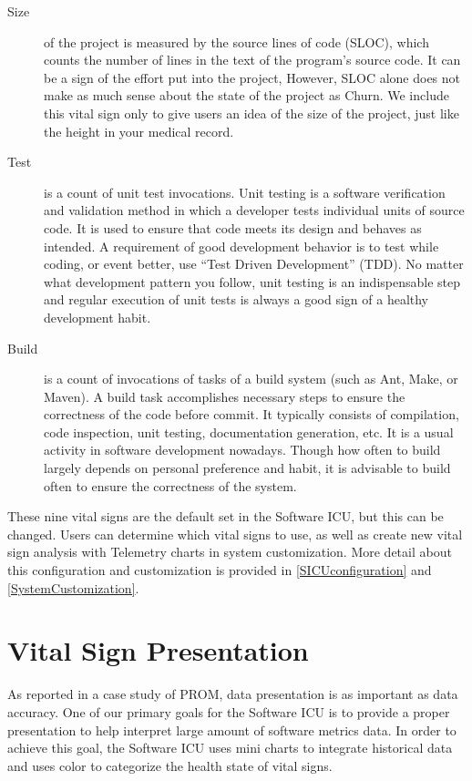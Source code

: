 \begin{description}
\item[Size] 
 of the project is measured by the source lines of code (SLOC), which counts the number of lines in the text of the program's source code. It can be a sign of the effort put into the project, However, SLOC alone does not make as much sense about the state of the project as Churn. We include this vital sign only to give users an idea of the size of the project, just like the height in your medical record.

\item[Test] 
is a count of unit test invocations. Unit testing is a software verification and validation method in which a developer tests individual units of source code. It is used to ensure that code meets its design and behaves as intended. A requirement of good development behavior is to test while coding, or event better, use ``Test Driven Development'' (TDD). No matter what development pattern you follow, unit testing is an indispensable step and regular execution of unit tests is always a good sign of a healthy development habit.

\item[Build] 
is a count of invocations of tasks of a build system (such as Ant, Make, or Maven). A build task accomplishes necessary steps to ensure the correctness of the code before commit. It typically consists of compilation, code inspection, unit testing, documentation generation, etc. It is a usual activity in software development nowadays. Though how often to build largely depends on personal preference and habit, it is advisable to build often to ensure the correctness of the system.

\end{description}

These nine vital signs are the default set in the Software ICU, but this can be changed. Users can determine which vital signs to use, as well as create new vital sign analysis with Telemetry charts in system customization. More detail about this configuration and customization is provided in \autoref{SICUconfiguration} and \autoref{SystemCustomization}.

\section{Vital Sign Presentation}
\label{presentation}
As reported in a case study of PROM, data presentation is as important as data accuracy\cite{prom09}. One of our primary goals for the Software ICU is to provide a proper presentation to help interpret large amount of software metrics data. In order to achieve this goal, the Software ICU uses mini charts to integrate historical data and uses color to categorize the health state of vital signs.


